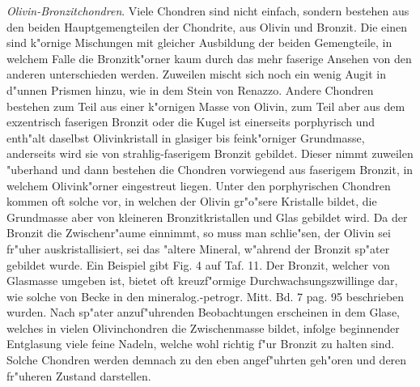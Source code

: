 \documentclass[a4paper, 11pt, oneside, polutonikogreek, german]{article}
\begin{document}
\emph{Olivin-Bronzitchondren}. Viele Chondren sind nicht einfach, sondern bestehen aus den beiden Hauptgemengteilen der Chondrite, aus Olivin und Bronzit. Die einen sind k"ornige Mischungen mit gleicher Ausbildung der beiden Gemengteile, in welchem Falle die Bronzitk"orner kaum durch das mehr faserige Ansehen von den anderen unterschieden werden. Zuweilen mischt sich noch ein wenig Augit in d"unnen Prismen hinzu, wie in dem Stein von Renazzo. Andere Chondren bestehen zum Teil aus einer k"ornigen Masse von Olivin, zum Teil aber aus dem exzentrisch faserigen Bronzit oder die Kugel ist einerseits porphyrisch und enth"alt daselbst Olivinkristall in glasiger bis feink"orniger Grundmasse, anderseits wird sie von strahlig-faserigem Bronzit gebildet. Dieser nimmt zuweilen "uberhand und dann bestehen die Chondren vorwiegend aus faserigem Bronzit, in welchem Olivink"orner eingestreut liegen. Unter den porphyrischen Chondren kommen oft solche vor, in welchen der Olivin gr"o"sere Kristalle bildet, die Grundmasse aber von kleineren Bronzitkristallen und Glas gebildet wird. Da der Bronzit die Zwischenr"aume einnimmt, so muss man schlie"sen, der Olivin sei fr"uher auskristallisiert, sei das "altere Mineral, w"ahrend der Bronzit sp"ater gebildet wurde. Ein Beispiel gibt Fig. 4 auf Taf. 11. Der Bronzit, welcher von Glasmasse umgeben ist, bietet oft kreuzf"ormige Durchwachsungszwillinge dar, wie solche von Becke in den mineralog.-petrogr. Mitt. Bd. 7 pag. 95 beschrieben wurden. Nach sp"ater anzuf"uhrenden Beobachtungen erscheinen in dem Glase, welches in vielen Olivinchondren die Zwischenmasse bildet, infolge beginnender Entglasung viele feine Nadeln, welche wohl richtig f"ur Bronzit zu halten sind. Solche Chondren werden demnach zu den eben angef"uhrten geh"oren und deren fr"uheren Zustand darstellen.
\end{document}
